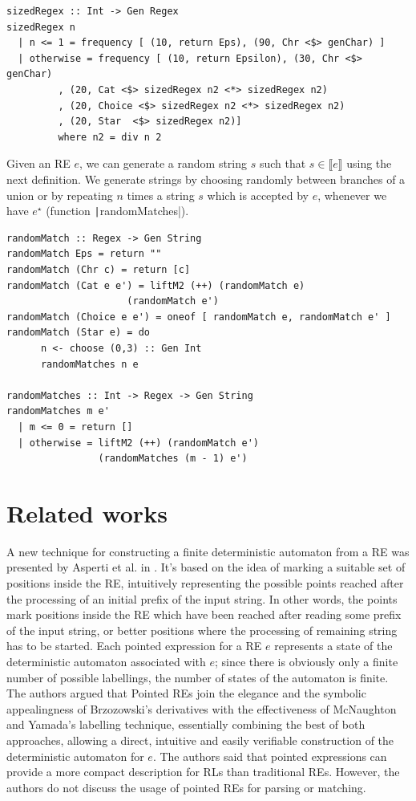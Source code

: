 \documentclass[oneside,12pt]{scrbook}
\newcommand{\haskell}[1]{\texttt|#1|}
\theoremstyle{definition}
\newcommand{\sembrackets}[1]{\ensuremath{\llbracket #1 \rrbracket}}
\theoremstyle{plain}
\theoremstyle{definition}
\begin{document}
\begin{verbatim}
sizedRegex :: Int -> Gen Regex
sizedRegex n
  | n <= 1 = frequency [ (10, return Eps), (90, Chr <$> genChar) ]
  | otherwise = frequency [ (10, return Epsilon), (30, Chr <$> genChar)
         , (20, Cat <$> sizedRegex n2 <*> sizedRegex n2)
         , (20, Choice <$> sizedRegex n2 <*> sizedRegex n2)
         , (20, Star  <$> sizedRegex n2)]
         where n2 = div n 2
\end{verbatim}


Given an RE $e$, we can generate a random string $s$ such that $s \in\sembrackets{e}$
using the next definition. We generate strings by choosing randomly between branches of
a union or by repeating $n$ times a string $s$ which is accepted by $e$, whenever we
have $e^\star$ (function \haskell{randomMatches}).

\begin{verbatim}
randomMatch :: Regex -> Gen String
randomMatch Eps = return ""
randomMatch (Chr c) = return [c]
randomMatch (Cat e e') = liftM2 (++) (randomMatch e)
				     (randomMatch e')
randomMatch (Choice e e') = oneof [ randomMatch e, randomMatch e' ]
randomMatch (Star e) = do
      n <- choose (0,3) :: Gen Int
      randomMatches n e

randomMatches :: Int -> Regex -> Gen String
randomMatches m e'
  | m <= 0 = return []
  | otherwise = liftM2 (++) (randomMatch e')
			    (randomMatches (m - 1) e')
\end{verbatim}

\chapter{Related works}\label{chapter:relatedworks}

A new technique for constructing a finite deterministic automaton from a RE was presented by Asperti et al. in \cite{Asperti10}. It's based on the idea of marking a suitable set of positions inside the RE, intuitively representing the possible points reached after the processing of an initial prefix of the input string. In other words, the points mark positions inside the RE which have been reached after reading some prefix of the input string, or better positions where the processing of remaining string has to be started. Each pointed expression for a RE $e$ represents a state of the deterministic automaton associated with $e$; since there is obviously only a finite number of possible labellings, the number of states of the automaton is finite. The authors argued that Pointed REs join the elegance and the symbolic appealingness of Brzozowski's derivatives with the effectiveness of McNaughton and Yamada's labelling technique, essentially combining the best of both approaches, allowing a direct, intuitive and easily verifiable construction of the deterministic automaton for $e$. The authors said that pointed expressions can provide a more compact description for RLs than traditional REs. However, the authors do not discuss the usage of pointed REs for parsing or matching. %
\end{document}
